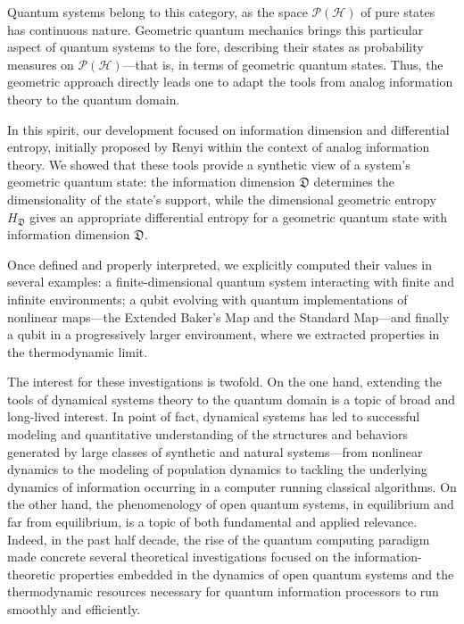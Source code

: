 \documentclass[draft,nofootinbib,pre,twocolumn,showkeys,superscriptaddress,preprintnumbers,floatfix]{revtex4-1}
\newcommand{\1}{\mathbbm{1}}
\newcommand{\PH}{\mathcal{P}(\mathcal{H})}
\begin{document}
Quantum systems belong to this category, as the space $\PH$ of pure states has
continuous nature. Geometric quantum mechanics brings this particular aspect of
quantum systems to the fore, describing their states as probability measures 
on $\PH$---that is, in terms of geometric quantum states. Thus, the geometric
approach directly leads one to adapt the tools from analog information theory
to the quantum domain. 

In this spirit, our development focused on information dimension and
differential entropy, initially proposed by Renyi within the context of analog
information theory. We showed that these tools provide a synthetic view of a
system's geometric quantum state: the information dimension $\mathfrak{D}$
determines the dimensionality of the state's support, while the dimensional
geometric entropy $H_{\mathfrak{D}}$ gives an appropriate differential entropy
for a geometric quantum state with information dimension $\mathfrak{D}$.

Once defined and properly interpreted, we explicitly computed their values in
several examples: a finite-dimensional quantum system interacting with finite
and infinite environments; a qubit evolving with quantum implementations of
nonlinear maps---the Extended Baker's Map and the Standard Map---and finally a
qubit in a progressively larger environment, where we extracted properties in
the thermodynamic limit. 

The interest for these investigations is twofold. On the one hand, extending
the tools of dynamical systems theory to the quantum domain is a topic of broad
and long-lived interest. In point of fact, dynamical systems has led to
successful modeling and quantitative understanding of the structures and
behaviors generated by large classes of synthetic and natural systems---from
nonlinear dynamics to the modeling of population dynamics to tackling the
underlying dynamics of information occurring in a computer running classical
algorithms. On the other hand, the phenomenology of open quantum systems, in
equilibrium and far from equilibrium, is a topic of both fundamental and
applied relevance. Indeed, in the past half decade, the rise of the quantum
computing paradigm made concrete several theoretical investigations focused on
the information-theoretic properties embedded in the dynamics of open quantum
systems and the thermodynamic resources necessary for quantum information
processors to run smoothly and efficiently.
\end{document}
